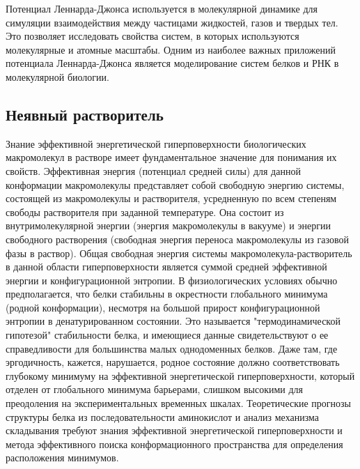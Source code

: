 Потенциал Леннарда-Джонса используется в молекулярной динамике для симуляции взаимодействия между частицами жидкостей, газов и твердых тел. Это позволяет исследовать свойства систем, в которых используются молекулярные и атомные масштабы. Одним из наиболее важных приложений потенциала Леннарда-Джонса является моделирование систем белков и РНК в молекулярной биологии.


\subsection{Неявный растворитель}


Знание эффективной энергетической гиперповерхности биологических макромолекул в растворе имеет фундаментальное значение для понимания их свойств. Эффективная энергия (потенциал средней силы) для данной конформации макромолекулы представляет собой свободную энергию системы, состоящей из макромолекулы и растворителя, усредненную по всем степеням свободы растворителя при заданной температуре. Она состоит из внутримолекулярной энергии (энергия макромолекулы в вакууме) и энергии свободного растворения (свободная энергия переноса макромолекулы из газовой фазы в раствор). Общая свободная энергия системы макромолекула-растворитель в данной области гиперповерхности является суммой средней эффективной энергии и конфигурационной энтропии. В физиологических условиях обычно предполагается, что белки стабильны в окрестности глобального минимума (родной конформации), несмотря на большой прирост конфигурационной энтропии в денатурированном состоянии. Это называется "термодинамической гипотезой" стабильности белка, и имеющиеся данные свидетельствуют о ее справедливости для большинства малых однодоменных белков. Даже там, где эргодичность, кажется, нарушается, родное состояние должно соответствовать глубокому минимуму на эффективной энергетической гиперповерхности, который отделен от глобального минимума барьерами, слишком высокими для преодоления на экспериментальных временных шкалах. Теоретические прогнозы структуры белка из последовательности аминокислот и анализ механизма складывания требуют знания эффективной энергетической гиперповерхности и метода эффективного поиска конформационного пространства для определения расположения минимумов.

